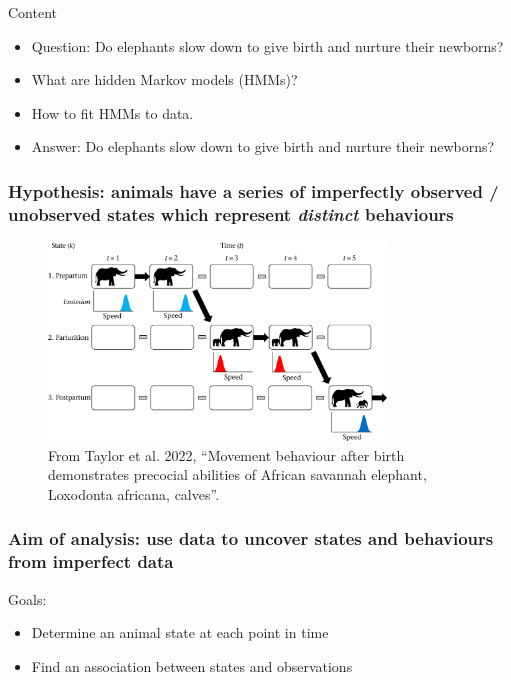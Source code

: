 \documentclass[main.tex]{subfiles}
\begin{document}
\begin{frame}{Content}

\begin{itemize}
    \item Question: Do elephants slow down to give birth and nurture their newborns?
    \item What are hidden Markov models (HMMs)?
    \item How to fit HMMs to data.
    \item Answer: Do elephants slow down to give birth and nurture their newborns? 
\end{itemize}
    
\end{frame}

\begin{frame}
\frametitle{Hypothesis: animals have a series of imperfectly observed / unobserved states which represent \textit{distinct} behaviours}

\begin{figure}
    \centering
    \includegraphics[width=0.8\textwidth]{figures/elephant_parturition.jpg}
    \caption{From Taylor et al. 2022, ``Movement behaviour after birth demonstrates precocial abilities of African savannah elephant, Loxodonta africana, calves''.}
    \label{fig:enter-label}
\end{figure}

\end{frame}

\begin{frame}
\frametitle{Aim of analysis: use data to uncover states and behaviours from imperfect data}

Goals:

\begin{itemize}
    \item Determine an animal state at each point in time
    \item Find an association between states and observations
\end{itemize}
    
\end{frame}
\end{document}
